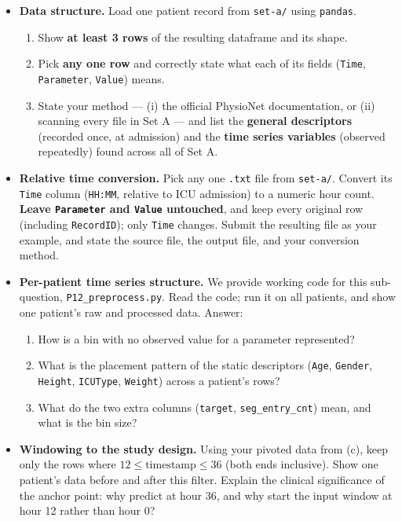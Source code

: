 \documentclass{article}
\begin{document}
\begin{itemize}
\item[(a) 8\%] \textbf{Data structure.} Load one patient record from \texttt{set-a/} using \texttt{pandas}.
  \begin{enumerate}
    \item Show \textbf{at least 3 rows} of the resulting dataframe and its shape.
    \item Pick \textbf{any one row} and correctly state what each of its fields (\texttt{Time}, \texttt{Parameter}, \texttt{Value}) means.
    \item State your method --- (i) the official PhysioNet documentation, or (ii) scanning every file in Set A --- and list the \textbf{general descriptors} (recorded once, at admission) and the \textbf{time series variables} (observed repeatedly) found across all of Set A.
  \end{enumerate}

\item[(b) 7\%] \textbf{Relative time conversion.} Pick any one \texttt{.txt} file from \texttt{set-a/}. Convert its \texttt{Time} column (\texttt{HH:MM}, relative to ICU admission) to a numeric hour count. \textbf{Leave \texttt{Parameter} and \texttt{Value} untouched}, and keep every original row (including \texttt{RecordID}); only \texttt{Time} changes. Submit the resulting file as your example, and state the source file, the output file, and your conversion method.

\item[(c) 7\%] \textbf{Per-patient time series structure.} We provide working code for this sub-question, \texttt{P12\_preprocess.py}. Read the code; run it on all patients, and show one patient's raw and processed data. Answer:
  \begin{enumerate}
    \item How is a bin with no observed value for a parameter represented?
    \item What is the placement pattern of the static descriptors (\texttt{Age}, \texttt{Gender}, \texttt{Height}, \texttt{ICUType}, \texttt{Weight}) across a patient's rows?
    \item What do the two extra columns (\texttt{target}, \texttt{seg\_entry\_cnt}) mean, and what is the bin size?
  \end{enumerate}

\item[(d) 7\%] \textbf{Windowing to the study design.} Using your pivoted data from (c), keep only the rows where $12 \le \text{timestamp} \le 36$ (both ends inclusive). Show one patient's data before and after this filter. Explain the clinical significance of the anchor point: why predict at hour 36, and why start the input window at hour 12 rather than hour 0?


\end{itemize}
\end{document}
